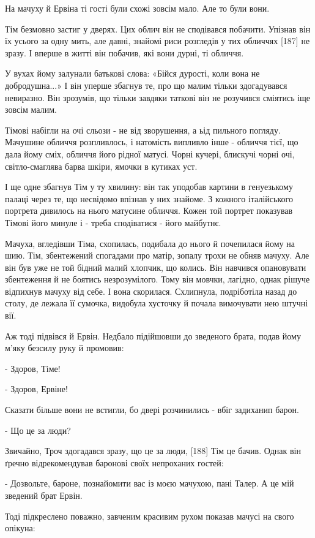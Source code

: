 На мачуху й Ервіна ті гості були схожі зовсім мало. Але то були вони.

Тім безмовно застиг у дверях. Цих облич він не сподівався побачити. Упізнав він їх усього за одну мить, але давні, знайомі риси розгледів у тих обличчях [187] не зразу. І вперше в житті він побачив, які вони дурні, ті обличчя.

У вухах йому залунали батькові слова: «Бійся дурості, коли вона не добродушна...» І він уперше збагнув те, про що малим тільки здогадувався невиразно. Він зрозумів, що тільки завдяки таткові він не розучився сміятись іще зовсім малим.

Тімові набігли на очі сльози - не від зворушення, а ьід пильного погляду. Мачушине обличчя розпливлось, і натомість випливло інше - обличчя тієї, що дала йому сміх, обличчя його рідної матусі. Чорні кучері, блискучі чорні очі, світло-смаглява барва шкіри, ямочки в кутиках уст.

І ще одне збагнув Тім у ту хвилину: він так уподобав картини в генуезькому палаці через те, що несвідомо впізнав у них знайоме. З кожного італійського портрета дивилось на нього матусине обличчя. Кожен той портрет показував Тімові його минуле і - треба сподіватися - його майбутнє.

Мачуха, вгледівши Тіма, схопилась, подибала до нього й почепилася йому на шию. Тім, збентежений спогадами про матір, зопалу трохи не обняв мачуху. Але він був уже не той бідний малий хлопчик, що колись. Він навчився опановувати збентеження й не боятись незрозумілого. Тому він мовчки, лагідно, однак рішуче відпихнув мачуху від себе. І вона скорилася. Схлипнула, подріботіла назад до столу, де лежала її сумочка, видобула хусточку й почала вимочувати нею штучні вії.

Аж тоді підвівся й Ервін. Недбало підійшовши до зведеного брата, подав йому м'яку безсилу руку й промовив:

- Здоров, Тіме!

- Здоров, Ервіне!

Сказати більше вони не встигли, бо двері розчинились - вбіг задиханип барон.

- Що це за люди?

Звичайно, Троч здогадався зразу, що це за люди, [188] Тім це бачив. Однак він ґречно відрекомендував баронові своїх непроханих гостей:

- Дозвольте, бароне, познайомити вас із моєю мачухою, пані Талер. А це мій зведений брат Ервін.

Тоді підкреслено поважно, завченим красивим рухом показав мачусі на свого опікуна:

